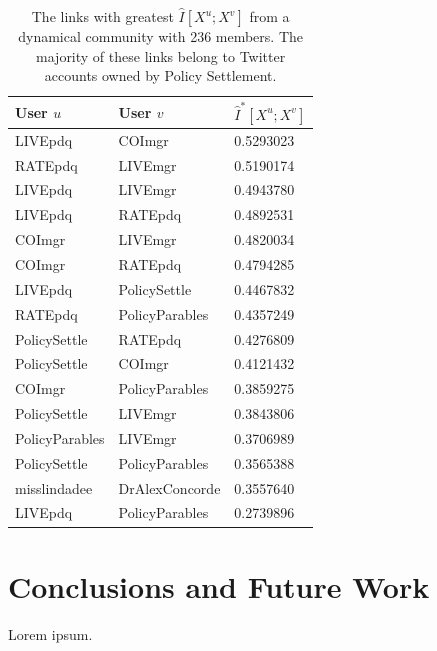 \documentclass[12pt]{article}
\begin{document}
\begin{table}
	\caption{The links with greatest $\hat{I}[X^{u}; X^{v}]$ from a dynamical community with 236 members. The majority of these links belong to Twitter accounts owned by Policy Settlement.}
	\centering
	\begin{tabular}{l l l}
		User $u$ & User $v$ & $\hat{I}^{*}[X^{u}; X^{v}]$ \\ \hline
		LIVEpdq & COImgr & 0.5293023 \\
		RATEpdq & LIVEmgr & 0.5190174 \\
		LIVEpdq & LIVEmgr & 0.4943780 \\
		LIVEpdq & RATEpdq & 0.4892531 \\
		COImgr & LIVEmgr & 0.4820034 \\
		COImgr & RATEpdq & 0.4794285 \\
		LIVEpdq & PolicySettle & 0.4467832 \\
		RATEpdq & PolicyParables & 0.4357249 \\
		PolicySettle & RATEpdq & 0.4276809 \\
		PolicySettle & COImgr & 0.4121432 \\
		COImgr & PolicyParables & 0.3859275 \\
		PolicySettle & LIVEmgr & 0.3843806 \\
		PolicyParables & LIVEmgr & 0.3706989 \\
		PolicySettle & PolicyParables & 0.3565388 \\
		misslindadee & DrAlexConcorde & 0.3557640 \\
		LIVEpdq & PolicyParables & 0.2739896 \\
	\end{tabular}
\end{table}

\section{Conclusions and Future Work}

Lorem ipsum.

\clearpage
\newpage



\end{document}

